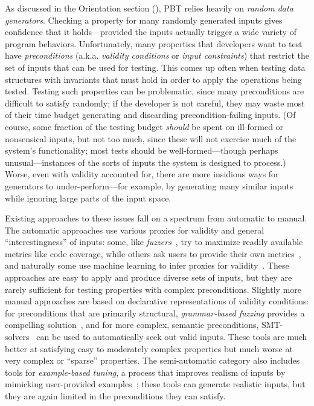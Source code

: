 As discussed in the Orientation section
(), PBT relies heavily on {\em random data
generators}.  Checking a property for many randomly generated inputs
gives confidence that it holds---provided the inputs actually trigger a wide
variety of program behaviors.
Unfortunately,
many properties that developers want to test have {\em preconditions}
(a.k.a.\relax{} {\em validity conditions} or {\em input constraints}) that
restrict the set of inputs that can be used for testing. This comes up often
when testing data structures with invariants that must hold in order to apply
the operations being tested. Testing such properties can be problematic, since
many preconditions are difficult to satisfy randomly; if the developer is not
careful, they may waste most of their time budget generating and
discarding precondition-failing inputs.
%
(Of course, some fraction of the testing budget {\em should} be spent on
ill-formed or nonsensical inputs, but not too much, since these will not
exercise much of the system's functionality; most tests should be
well-formed---though perhaps unusual---instances of the sorts of inputs the
system is designed to process.)
%
Worse, even with validity accounted for, there are
more insidious ways for generators to under-perform---for example, by
generating many similar inputs while ignoring large parts of
the input space.

Existing approaches to these issues
fall on a spectrum from automatic to manual. The automatic approaches use
various proxies for validity and general ``interestingness'' of
inputs: some, like {\em
fuzzers}~\cite{afl-readme}, try to maximize readily available metrics like code
coverage, while others ask users to provide their own metrics~\cite{loscher2017targetedpbt}, and
naturally some use machine learning to infer proxies for
validity~\cite{godefroid2017learn, DBLP:conf/icse/ReddyLPS20}. These approaches
are easy to apply and produce diverse sets of inputs, but they are rarely
sufficient for testing properties with complex preconditions. Slightly more
manual approaches are based on declarative representations of validity
conditions: for preconditions that are primarily structural, {\em grammar-based
fuzzing} provides a compelling solution~\cite{godefroid2008grammar,
holler2012fuzzing, veggalam2016ifuzzer, wang2019superion,
srivastava2021gramatron}, and for more complex, semantic preconditions,
SMT-solvers~\cite{dewey2017automated, LuckPOPL,
steinhofel2022input} can be used to automatically seek out valid
inputs. These tools are
much better at satisfying easy to moderately complex properties but
much worse at very complex or ``sparse'' properties. The semi-automatic
category also includes tools for {\em example-based tuning}, a process that
improves realism of inputs by mimicking user-provided
examples~\cite{soremekun2020inputs}; these tools can generate
realistic inputs, but they are again limited in the preconditions they can
satisfy.

